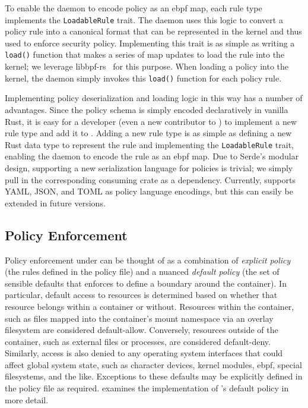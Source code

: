 To enable the daemon to encode policy as an \gls{ebpf} map, each rule type implements the
\texttt{LoadableRule} trait. The daemon uses this logic to convert a policy rule into
a canonical format that can be represented in the kernel and thus used to enforce security
policy. Implementing this trait is as simple as writing a \texttt{load()} function that
makes a series of map updates to load the rule into the kernel; we leverage
libbpf-rs~\cite{libbpf-rs} for this purpose. When loading a policy into the kernel, the
daemon simply invokes this \texttt{load()} function for each policy rule.

Implementing policy deserialization and loading logic in this way has a number of
advantages. Since the policy schema is simply encoded declaratively in vanilla Rust, it is
easy for a developer (even a new contributor to \bpfcontain{}) to implement a new rule
type and add it to \bpfcontain{}. Adding a new rule type is as simple as defining a new
Rust data type to represent the rule and implementing the \texttt{LoadableRule} trait,
enabling the daemon to encode the rule as an \gls{ebpf} map. Due to Serde's modular
design, supporting a new serialization language for \bpfcontain{} policies is trivial; we
simply pull in the corresponding consuming crate as a dependency. Currently, \bpfcontain{}
supports YAML, JSON, and TOML as policy language encodings, but this can easily be
extended in future versions.

\subsection{Policy Enforcement}%
\label{ss:bpfcontain-enforcement}

Policy enforcement under \bpfcontain{} can be thought of as a combination of
\textit{explicit policy} (the rules defined in the policy file) and a nuanced
\textit{default policy} (the set of sensible defaults that \bpfcontain{} enforces to
define a boundary around the container). In particular, default access to resources is
determined based on whether that resource belongs within a container or without.
Resources within the container, such as files mapped into the container's mount namespace
via an overlay filesystem are considered default-allow. Conversely, resources outside of
the container, such as external files or processes, are considered default-deny.
Similarly, access is also denied to any operating system interfaces that could affect
global system state, such as character devices, kernel modules, \gls{ebpf}, special
filesystems, and the like. Exceptions to these defaults may be explicitly defined in the
policy file as required.  examines the implementation of
\bpfcontain{}'s default policy in more detail.

